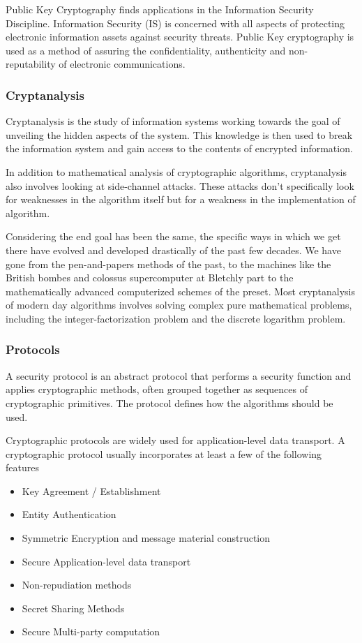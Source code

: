 Public Key Cryptography finds applications in the Information Security Discipline. Information Security (IS) is concerned with all aspects of protecting electronic information assets against security threats. Public Key cryptography is used as a method of assuring the confidentiality, authenticity and non-reputability of electronic communications.  

\subsubsection{Cryptanalysis}

Cryptanalysis is the study of information systems working towards the goal of unveiling the hidden aspects of the system. This knowledge is then used to break the information system and gain access to the contents of encrypted information.

In addition to mathematical analysis of cryptographic algorithms, cryptanalysis also involves looking at side-channel attacks. These attacks don't specifically look for weaknesses in the algorithm itself but for a weakness in the implementation of algorithm.

Considering the end goal has been the same, the specific ways in which we get there have evolved and developed drastically of the past few decades. We have gone from the pen-and-papers methods of the past, to the machines like the British bombes and colossus supercomputer at Bletchly part to the mathematically advanced computerized schemes of the preset. Most cryptanalysis of modern day algorithms involves solving complex pure mathematical problems, including the integer-factorization problem and the discrete logarithm problem.  

\subsubsection{Protocols}

A security protocol is an abstract protocol that performs a security function and applies cryptographic methods, often grouped together as sequences of cryptographic primitives. The protocol defines how the algorithms should be used. 

Cryptographic protocols are widely used for application-level data transport. A cryptographic protocol usually incorporates at least a few of the following features
\begin{itemize}
\item{Key Agreement / Establishment}
\item{Entity Authentication}
\item{Symmetric Encryption and message material construction}
\item{Secure Application-level data transport}
\item{Non-repudiation methods}
\item{Secret Sharing Methods}
\item{Secure Multi-party computation}
\end{itemize} 

